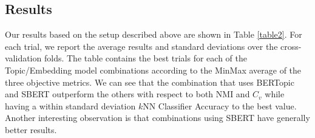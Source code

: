 \documentclass[a4paper]{article}
\begin{document}
\subsection{Results}
Our results based on the setup described above are shown in Table \ref{table2}. For each trial, we report the average results and standard deviations over the cross-validation folds. The table contains the best trials for each of the Topic/Embedding model combinations according to the MinMax average of the three objective metrics. We can see that the combination that uses BERTopic and SBERT outperform the others with respect to both NMI and $C_v$ while having a within standard deviation $k$NN Classifier Accuracy to the best value. Another interesting observation is that combinations using SBERT have generally better results.

\begin{table}[H]
  \centering
  \caption{Hyperparameter tuning best results per topic and embedding model}
  \label{table2}
\end{table}
\end{document}
